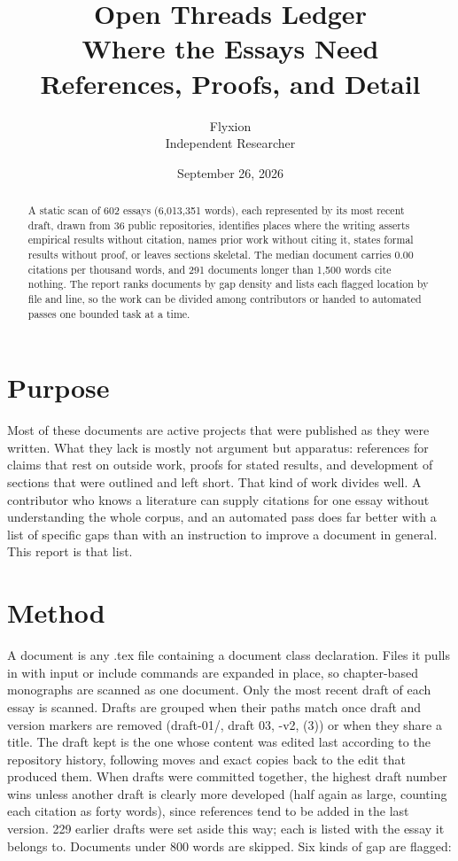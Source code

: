 \documentclass[11pt]{article}
\title{Open Threads Ledger\\[0.3em]\large Where the Essays Need References, Proofs, and Detail}
\author{Flyxion\\Independent Researcher}
\date{September 26, 2026}
\begin{document}
\maketitle

\begin{abstract}
A static scan of 602 essays (6,013,351 words), each represented by its most recent draft, drawn from 36 public repositories, identifies places where the writing asserts empirical results without citation, names prior work without citing it, states formal results without proof, or leaves sections skeletal. The median document carries 0.00 citations per thousand words, and 291 documents longer than 1,500 words cite nothing. The report ranks documents by gap density and lists each flagged location by file and line, so the work can be divided among contributors or handed to automated passes one bounded task at a time.
\end{abstract}

\section{Purpose}

Most of these documents are active projects that were published as they were written. What they lack is mostly not argument but apparatus: references for claims that rest on outside work, proofs for stated results, and development of sections that were outlined and left short. That kind of work divides well. A contributor who knows a literature can supply citations for one essay without understanding the whole corpus, and an automated pass does far better with a list of specific gaps than with an instruction to improve a document in general. This report is that list.

\section{Method}

A document is any .tex file containing a document class declaration. Files it pulls in with input or include commands are expanded in place, so chapter-based monographs are scanned as one document. Only the most recent draft of each essay is scanned. Drafts are grouped when their paths match once draft and version markers are removed (draft-01/, draft 03, -v2, (3)) or when they share a title. The draft kept is the one whose content was edited last according to the repository history, following moves and exact copies back to the edit that produced them. When drafts were committed together, the highest draft number wins unless another draft is clearly more developed (half again as large, counting each citation as forty words), since references tend to be added in the last version. 229 earlier drafts were set aside this way; each is listed with the essay it belongs to. Documents under 800 words are skipped. Six kinds of gap are flagged:
\end{document}
